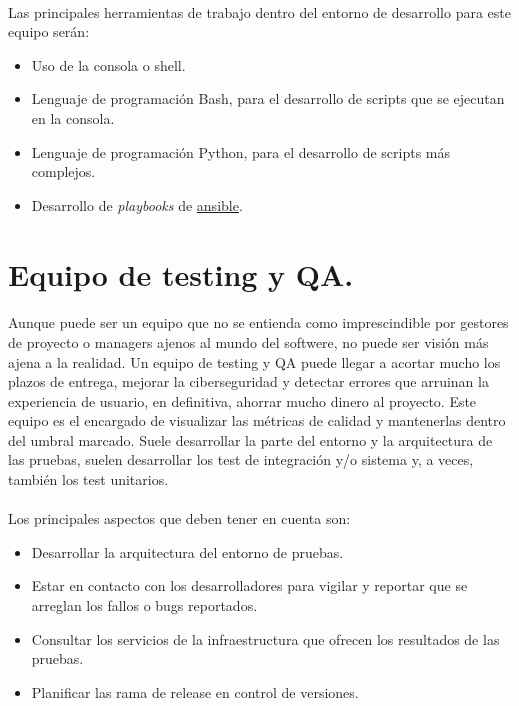 \paragraph{}Las principales herramientas de trabajo dentro del entorno de desarrollo
para este equipo serán:

\begin{itemize}
    \item Uso de la consola o \gls{shell}.
    \item Lenguaje de programación Bash, para el desarrollo de \gls{scripts} que se
    ejecutan en la consola.
    \item Lenguaje de programación Python, para el desarrollo de \gls{scripts} más complejos.
    \item Desarrollo de \emph{playbooks} de \hyperref[sec:ansible]{ansible}.
\end{itemize}

\section{Equipo de testing y QA.}\label{sec:testingqa}

\paragraph{}Aunque puede ser un equipo que no se entienda como imprescindible por gestores
de proyecto o managers ajenos al mundo del softwere, no puede ser visión más ajena a
la realidad. Un equipo de testing y QA puede llegar a acortar mucho los plazos de entrega,
mejorar la ciberseguridad y detectar errores que arruinan la experiencia de usuario,
en definitiva, ahorrar mucho dinero al proyecto. Este equipo es el encargado de visualizar
las métricas de calidad y mantenerlas dentro del umbral marcado. Suele desarrollar
la parte del entorno y la arquitectura de las pruebas, suelen desarrollar los test de
integración y/o sistema y, a veces, también los test unitarios.

\paragraph{}Los principales aspectos que deben tener en cuenta son:

\begin{itemize}
    \item Desarrollar la arquitectura del entorno de pruebas.
    \item Estar en contacto con los desarrolladores para vigilar y reportar que se arreglan
    los fallos o bugs reportados.
    \item Consultar los servicios de la infraestructura que ofrecen los resultados de
    las pruebas.
    \item Planificar las rama de release en control de versiones.
\end{itemize}

